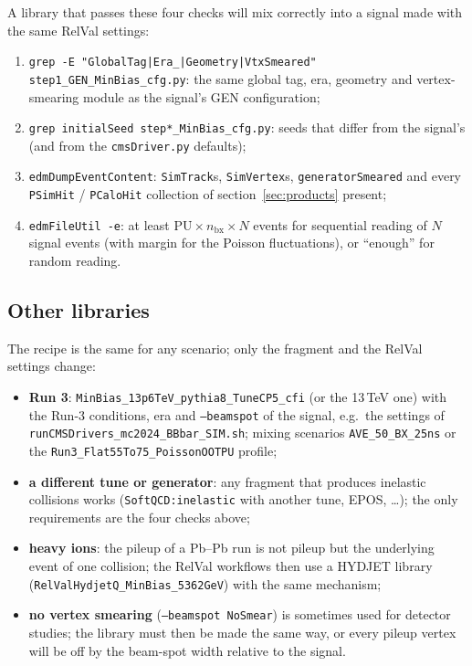 \documentclass[11pt,a4paper]{article}
\newcommand{\code}[1]{\texttt{#1}}
\newcommand{\bx}{\ensuremath{\mathrm{bx}}}
\begin{document}
A library that passes these four checks will mix correctly into a signal made with the same RelVal settings:
\begin{enumerate}
\item \code{grep -E "GlobalTag|Era\_|Geometry|VtxSmeared" step1\_GEN\_MinBias\_cfg.py}: the same global tag, era,
  geometry and vertex-smearing module as the signal's GEN configuration;
\item \code{grep initialSeed step*\_MinBias\_cfg.py}: seeds that differ from the signal's (and from the
  \code{cmsDriver.py} defaults);
\item \code{edmDumpEventContent}: \code{SimTrack}s, \code{SimVertex}s, \code{generatorSmeared} and every
  \code{PSimHit} / \code{PCaloHit} collection of section~\ref{sec:products} present;
\item \code{edmFileUtil -e}: at least $\mathrm{PU}\times n_{\bx}\times N$ events for sequential reading of
  $N$ signal events (with margin for the Poisson fluctuations), or ``enough'' for random reading.
\end{enumerate}

\subsection{Other libraries}

The recipe is the same for any scenario; only the fragment and the RelVal settings change:
\begin{itemize}
\item \textbf{Run 3}: \code{MinBias\_13p6TeV\_pythia8\_TuneCP5\_cfi} (or the 13\,TeV one) with the Run-3
  conditions, era and \code{--beamspot} of the signal, e.g.\ the settings of
  \code{runCMSDrivers\_mc2024\_BBbar\_SIM.sh}; mixing scenarios \code{AVE\_50\_BX\_25ns} or the
  \code{Run3\_Flat55To75\_PoissonOOTPU} profile;
\item \textbf{a different tune or generator}: any fragment that produces inelastic collisions works
  (\code{SoftQCD:inelastic} with another tune, EPOS, \ldots); the only requirements are the four checks
  above;
\item \textbf{heavy ions}: the pileup of a Pb--Pb run is not pileup but the underlying event of one
  collision; the RelVal workflows then use a HYDJET library (\code{RelValHydjetQ\_MinBias\_5362GeV}) with
  the same mechanism;
\item \textbf{no vertex smearing} (\code{--beamspot NoSmear}) is sometimes used for detector studies; the
  library must then be made the same way, or every pileup vertex will be off by the beam-spot width relative
  to the signal.
\end{itemize}
\end{document}
